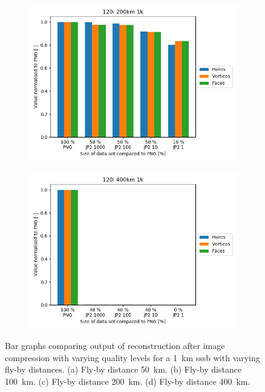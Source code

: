 \begin{figure}[htb]
        \begin{subfigure}[b]{0.49\textwidth}
            \centering
            \includegraphics[width=\textwidth]{doc/thesis/0_figures/recon/120i_200km_1k.png}
            \caption{}
            \label{fig:recon_120_200_1}
        \end{subfigure}
        \begin{subfigure}[b]{0.49\textwidth}
            \centering
            \includegraphics[width=\textwidth]{doc/thesis/0_figures/recon/120i_400km_1k.png}
            \caption{}
            \label{fig:recon_120_400_1}
        \end{subfigure}
    \caption{Bar graphs comparing output of reconstruction after image compression with varying quality levels for a \SI{1}{\kilo\meter} \gls{sssb} with varying fly-by distances. (a) Fly-by distance \SI{50}{\kilo\meter}. (b) Fly-by distance \SI{100}{\kilo\meter}. (c) Fly-by distance \SI{200}{\kilo\meter}. (d) Fly-by distance \SI{400}{\kilo\meter}.}
    \label{fig:recon_stats_1}
\end{figure}

